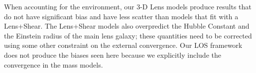 When accounting for the environment, our 3-D Lens models produce results that do not have significant bias and have less scatter than models that fit with a Lens+Shear. The Lens+Shear models also overpredict the Hubble Constant and the Einstein radius of the main lens galaxy; these quantities need to be corrected using some other constraint on the external convergence. Our LOS framework does not produce the biases seen here because we explicitly include the convergence in the mass models.